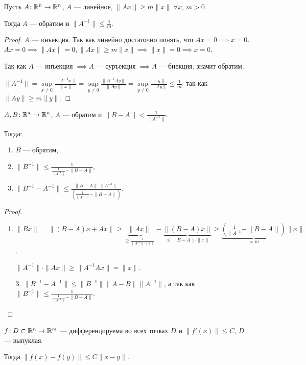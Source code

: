 \begin{theorem}
    Пусть $A\!: \mathbb{R}^n \to \mathbb{R}^n$,  $A$ --- линейное,  $\|Ax\| \ge m \|x\|\ \forall x$, $m > 0$.

    Тогда $A$ --- обратим и  $\|A^{-1}\| \le \frac{1}{m}$.
\end{theorem}
\begin{proof}
    $A$ --- инъекция. Так как линейно достаточно понять, что  $Ax = 0 \implies x = 0$. $Ax = 0 \implies \|Ax\| = 0, \|Ax\| \ge m\|x\| \implies \|x\| = 0 \implies x = 0$.

    Так как $A$ --- инъекция  $\implies A$ --- суръекция $\implies A$ --- биекция, значит обратим. 

    $\|A^{-1}\| = \sup\limits_{x \neq 0} \frac{\|A^{-1}x\|}{\|x\|} = \sup\limits_{y \neq 0} \frac{\|A^{-1}Ay\|}{\|Ay\|} = \sup\limits_{y \neq 0} \frac{\|y\|}{\|Ay\|} \le \frac{1}{m}$. так как $\|Ay\| \ge m \|y\|$.
\end{proof}
\begin{theorem}
    $A, B\!: \mathbb{R}^n \to \mathbb{R}^n$,  $A$ --- обратим и  $\|B-A\| < \frac{1}{\|A^{-1}\|}$.

    Тогда:
    \begin{enumerate}
        \item $B$ --- обратим,
        \item  $\|B^{-1}\| \le \frac{1}{\frac{1}{\|A^{-1}\|}- \|B-A\|}$,
        \item $\|B^{-1} - A^{-1}\| \le \frac{\|B-A\| \cdot \|A^{-1}\|}{(\frac{1}{\|A^{-1}\|} - \|B-A\|)}$.
    \end{enumerate}
\end{theorem}
\begin{proof}
   \slashn
   \begin{enumerate}
       \item    $\|Bx\| = \|(B-A)x + Ax\| \ge \underbrace{\|Ax\|}_{\ge \frac{1}{\|A^{-1}\| \cdot \|x\|}} - \underbrace{\|(B-A)x\|}_{\le \|B-A\|\cdot\|x\|} \ge \underbrace{\left(\frac{1}{\|A^{-1}} - \|B-A\|\right)}_{=m}\|x\|$.

       $\|A^{-1}\| \cdot \|Ax\| \ge \|A^{-1}Ax\| = \|x\|$.
   \item[3.] $\|B^{-1} - A^{-1}\| \le \|B^{-1}\| \|A-B\|\|A^{-1}\|$, а так как $\|B^{-1}\| \le \frac{1}{\frac{1}{\|A^{-1}\|} - \|B-A\|}$.
   \end{enumerate}
\end{proof}
\begin{theorem}
    $f\!: D \subset \mathbb{R}^n \to \mathbb{R}^m$ --- дифференцируема во всех точках $D$ и $\|f'(x)\| \le C$, $D$ --- выпуклая.

    Тогда $\|f(x) - f(y)\| \le C\|x-y\|$.
\end{theorem}
